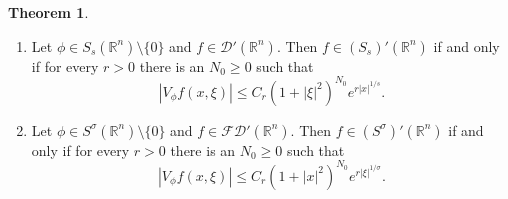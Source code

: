 \documentclass[11pt,a4paper,reqno]{amsart}
\numberwithin{equation}{section}
\theoremstyle{definition}
\newtheorem{thm}{Theorem}[section]
\theoremstyle{definition}
\begin{document}
\begin{thm}\label{thm:SsSTFTdual}
\begin{enumerate}[label=(\roman*)]
    \item Let $\phi\in S_s(\mathbb{R}^n)\setminus\{0\}$ and $f\in \mathscr{D}'(\mathbb{R}^n)$. Then $f\in(S_s)'(\mathbb{R}^n)$ if and only if for every $r>0$ there is an $N_0\geq 0$ such that
    \begin{equation}\label{eq:STFTdual1}
        |V_\phi f(x,\xi)| \leq C_{r}(1+|\xi|^2)^{N_0} e^{r|x|^{1/s}}.
    \end{equation}
     \item Let $\phi\in S^\sigma(\mathbb{R}^n)\setminus\{0\}$ and $f\in \mathscr{F}\mathscr{D}'(\mathbb{R}^n)$. Then $f\in(S^\sigma)'(\mathbb{R}^n)$ if and only if for every $r>0$ there is an $N_0\geq 0$ such that
    \begin{equation}\label{eq:STFTdual2}
        |V_\phi f(x,\xi)| \leq C_{r}(1+|x|^2)^{N_0} e^{r|\xi|^{1/\sigma}}.
    \end{equation}
\end{enumerate}
\end{thm}
\end{document}
